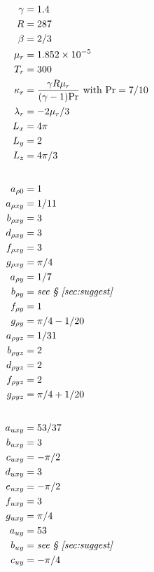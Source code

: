 \documentclass[10pt,reqno]{amsart}
\begin{document}
\begin{table}[p]
\allowdisplaybreaks
\begin{multicols}{3}
\begin{small}
\begin{align*}
\gamma &= \num{1.4} \\
R &= 287 \\
\beta &= 2 / 3 \\
\mu_r &= \num{1.852e-5} \\
T_r &= 300 \\
\kappa_r & = \frac{\gamma R \mu_r}{(\gamma - 1) \mbox{Pr}}
             \text{ with }\mbox{Pr} = 7/10 \\
\lambda_r & = - 2 \mu_r / 3 \\
L_x &= 4 \pi \\
L_y &= 2 \\
L_z &= 4 \pi / 3 \\
\intertext{}
a_{\rho{}0} &= 1 \\
a_{\rho{}xy} &= 1 / 11 \\
b_{\rho{}xy} &= 3 \\
d_{\rho{}xy} &= 3 \\
f_{\rho{}xy} &= 3 \\
g_{\rho{}xy} &= \pi / 4 \\
a_{\rho{}y} &= 1 / 7 \\
b_{\rho{}y} &= \text{\emph{see \textsection{}~\ref{sec:suggest}}} \\
f_{\rho{}y} &= 1 \\
g_{\rho{}y} &= \pi / 4 - 1 / 20 \\
a_{\rho{}yz} &= 1 / 31 \\
b_{\rho{}yz} &= 2 \\
d_{\rho{}yz} &= 2 \\
f_{\rho{}yz} &= 2 \\
g_{\rho{}yz} &= \pi / 4 + 1 / 20 \\
\intertext{}
a_{uxy} &= 53 / 37 \\
b_{uxy} &= 3 \\
c_{uxy} &= - \pi / 2 \\
d_{uxy} &= 3 \\
e_{uxy} &= - \pi / 2 \\
f_{uxy} &= 3 \\
g_{uxy} &= \pi / 4 \\
a_{uy} &= 53 \\
b_{uy} &= \text{\emph{see \textsection{}~\ref{sec:suggest}}} \\
c_{uy} &= -\pi / 4 \\

\end{align*}
\end{small}
\end{multicols}
\end{table}
\end{document}
